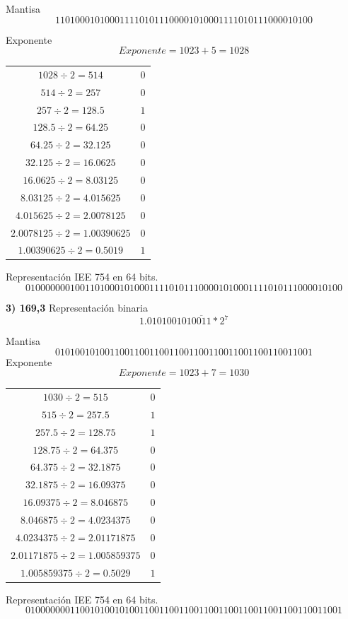 \documentclass[12pt]{article}
\begin{document}
Mantisa 
$$1 1010 0010 1000 1111 0101 1100 0010 1000 1111 0101 1100 0010 100$$

Exponente
$$Exponente= 1023+5=1028$$
\begin{center}
    \begin{tabular}{|c|c|}
        \hline
        $1028 \div 2 = 514$ & $0$\\
        $514 \div 2 = 257$ & $0$\\
        $257 \div 2 = 128.5$ & $1$\\
        $128.5 \div 2 = 64.25$ & $0$\\
        $64.25 \div 2 = 32.125$ & $0$\\
        $32.125 \div 2 = 16.0625$ & $0$\\
        $16.0625 \div 2 = 8.03125$ & $0$\\
        $8.03125 \div 2 = 4.015625$ & $0$\\
        $4.015625 \div 2 = 2.0078125$ & $0$\\
        $2.0078125 \div 2 = 1.00390625$ & $0$\\
        $1.00390625 \div 2 = 0.5019$ & $1$\\
        \hline
      \end{tabular} 
\end{center}
Representación IEE 754 en 64 bits.
$$0100000001001101000101000111101011100001010001111010111000010100$$

\large{\textbf{3) 169,3}}
\normalsize
\newline Representación binaria
$$ 1.010100101\overline{0011}*2^7$$

Mantisa 
$$0101 00101 0011 0011 0011 0011 0011 0011 0011 0011 0011 0011 001$$
Exponente
$$Exponente= 1023+7=1030$$
\begin{center}
    \begin{tabular}{|c|c|}
        \hline
        $1030 \div 2 = 515$ & $0$\\
        $515 \div 2 = 257.5$ & $1$\\
        $257.5 \div 2 = 128.75$ & $1$\\
        $128.75 \div 2 = 64.375$ & $0$\\
        $64.375 \div 2 = 32.1875$ & $0$\\
        $32.1875 \div 2 = 16.09375$ & $0$\\
        $16.09375 \div 2 = 8.046875$ & $0$\\
        $8.046875 \div 2 = 4.0234375$ & $0$\\
        $4.0234375 \div 2 = 2.01171875$ & $0$\\
        $2.01171875 \div 2 = 1.005859375$ & $0$\\
        $1.005859375 \div 2 = 0.5029$ & $1$\\
        \hline
      \end{tabular} 
\end{center}
Representación IEE 754 en 64 bits.
$$0100000001100101001010011001100110011001100110011001100110011001$$
\end{document}
